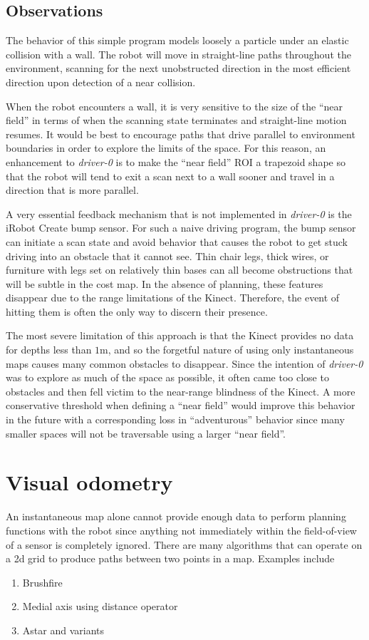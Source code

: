 \documentclass[letterpaper]{article}%
\begin{document}
\subsection{Observations}
The behavior of this simple program models loosely a particle under an elastic
collision with a wall. The robot will move in straight-line paths throughout
the environment, scanning for the next unobstructed direction in the most
efficient direction upon detection of a near collision.

When the robot encounters a wall, it is very sensitive to the size of the
``near field'' in terms of when the scanning state terminates and straight-line
motion resumes.  It would be best to encourage paths that drive parallel to
environment boundaries in order to explore the limits of the space. For this
reason, an enhancement to {\em driver-0} is to make the ``near field'' ROI a
trapezoid shape so that the robot will tend to exit a scan next to a wall
sooner and travel in a direction that is more parallel.

A very essential feedback mechanism that is not implemented in {\em driver-0}
is the iRobot Create bump sensor. For such a naive driving program, the bump
sensor can initiate a scan state and avoid behavior that causes the robot to
get stuck driving into an obstacle that it cannot see. Thin chair legs, thick
wires, or furniture with legs set on relatively thin bases can all become
obstructions that will be subtle in the cost map. In the absence of planning,
these features disappear due to the range limitations of the Kinect. Therefore,
the event of hitting them is often the only way to discern their presence.

The most severe limitation of this approach is that the Kinect provides no data
for depths less than $1$m, and so the forgetful nature of using only
instantaneous maps causes many common obstacles to disappear. Since the
intention of {\em driver-0} was to explore as much of the space as possible, it
often came too close to obstacles and then fell victim to the near-range
blindness of the Kinect. A more conservative threshold when defining a ``near
field'' would improve this behavior in the future with a corresponding loss in
``adventurous'' behavior since many smaller spaces will not be traversable
using a larger ``near field''.

\section{Visual odometry}
An instantaneous map alone cannot provide enough data to perform planning
functions with the robot since anything not immediately within the
field-of-view of a sensor is completely ignored. There are many algorithms that
can operate on a 2d grid to produce paths between two points in a map. Examples
include
\begin{enumerate}
  \item Brushfire
  \item Medial axis using distance operator
  \item Astar and variants
\end{enumerate}
\end{document}
